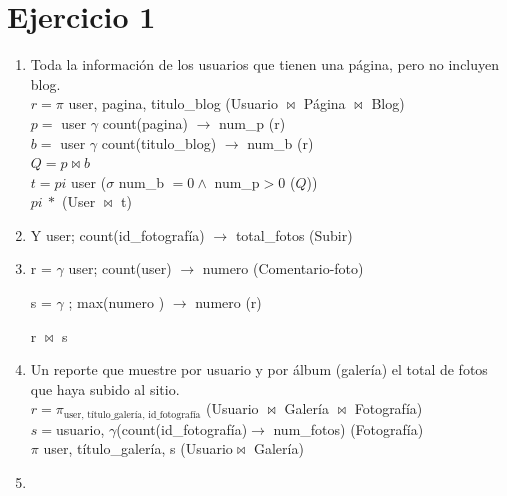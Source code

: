 \documentclass[a4paper, 12pt]{report}
\begin{document}
\section*{Ejercicio 1}{
\begin{enumerate}[label=\alph*)]
\item{Toda la información de los usuarios que tienen una página, pero no
        incluyen blog.\\
    $r = \pi$ user,  pagina, titulo\_blog (Usuario $\Join$ Página $\Join$ Blog)\\
    $p = $ user $\gamma$ count(pagina) $\rightarrow$ num\_p (r)\\
    $b = $ user $\gamma$ count(titulo\_blog) $\rightarrow$ num\_b (r)\\
    $Q = p \Join b$\\
    $t =pi$ user ($\sigma$ num\_b $= 0 \wedge$ num\_p$ > 0$ ($Q$))\\
    $pi\ *$ (User $\Join$ t)
    }
\item{Y user; count(id\_fotografía) $\rightarrow$ total\_fotos (Subir)\\}
\item{r = $\gamma$ user; count(user) $\rightarrow$ numero (Comentario-foto)

s = $\gamma$ ; max(numero ) $\rightarrow$ numero (r)

r $\Join$ s}
\item{Un reporte que muestre por usuario y por álbum (galería) el total de fotos
        que haya subido al sitio.\\
    $r = \pi_{\text{user, título\_galería, id\_fotografía}}$ (Usuario $\Join$ Galería
        $\Join$ Fotografía)\\
    $s =$usuario,  $\gamma$(count(id\_fotografía)$\rightarrow$ num\_fotos) (Fotografía)\\
    $\pi $ user, título\_galería, s (Usuario$\Join$ Galería)
}
\item{}
\end{enumerate}
}
\end{document}
